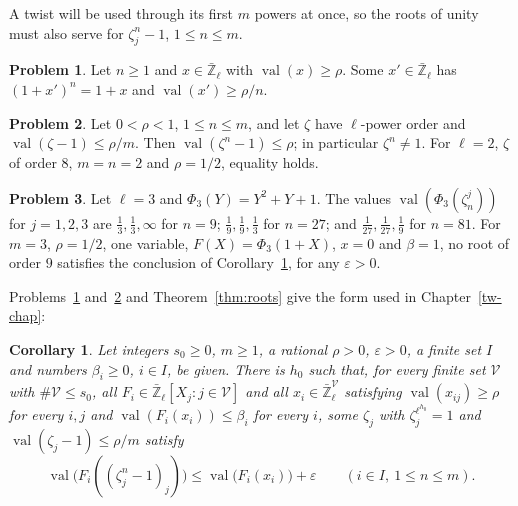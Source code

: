 \documentclass[reqno]{amsart}
\newcounter{chap}
\theoremstyle{definition}
\newtheorem{problem}{Problem}[section]
\theoremstyle{plain}
\newtheorem{corollary}[theorem]{Corollary}
\newcommand{\Zl}{\bar{\mathbb{Z}}_\ell}
\newcommand{\val}{\operatorname{val}}
\begin{document}
\medskip
A twist will be used through its first \(m\) powers at once, so the roots of unity must also serve for \(\zeta_j^n - 1\), \(1 \le n \le m\).

\begin{problem}\label{pr:root-of-x}
Let \(n \ge 1\) and \(x \in \Zl\) with \(\val(x) \ge \rho\).  Some \(x' \in \Zl\) has \((1 + x')^n = 1 + x\) and \(\val(x') \ge \rho/n\).
\end{problem}

\begin{problem}\label{pr:powers-far}
Let \(0 < \rho < 1\), \(1 \le n \le m\), and let \(\zeta\) have \(\ell\)-power order and \(\val(\zeta - 1) \le \rho/m\).  Then \(\val(\zeta^n - 1) \le \rho\); in particular \(\zeta^n \ne 1\).  For \(\ell = 2\), \(\zeta\) of order \(8\), \(m = n = 2\) and \(\rho = 1/2\), equality holds.
\end{problem}

\begin{problem}\label{pr:powers-table}
Let \(\ell = 3\) and \(\Phi_3(Y) = Y^2 + Y + 1\).  The values \(\val(\Phi_3(\zeta_n^j))\) for \(j = 1, 2, 3\) are \(\tfrac13, \tfrac13, \infty\) for \(n = 9\); \(\tfrac19, \tfrac19, \tfrac13\) for \(n = 27\); and \(\tfrac1{27}, \tfrac1{27}, \tfrac19\) for \(n = 81\).  For \(m = 3\), \(\rho = 1/2\), one variable, \(F(X) = \Phi_3(1 + X)\), \(x = 0\) and \(\beta = 1\), no root of order \(9\) satisfies the conclusion of Corollary~\ref{pr:powers}, for any \(\varepsilon > 0\).
\end{problem}

Problems~\ref{pr:root-of-x} and~\ref{pr:powers-far} and Theorem~\ref{thm:roots} give the form used in Chapter~\ref{tw-chap}:

\begin{corollary}\label{pr:powers}
Let integers \(s_0 \ge 0\), \(m \ge 1\), a rational \(\rho > 0\), \(\varepsilon > 0\), a finite set \(I\) and numbers \(\beta_i \ge 0\), \(i \in I\), be given.  There is \(h_0\) such that, for every finite set \(\mathcal V\) with \(\#\mathcal V \le s_0\), all \(F_i \in \Zl[X_j : j \in \mathcal V]\) and all \(x_i \in \Zl^\mathcal V\) satisfying \(\val(x_{ij}) \ge \rho\) for every \(i, j\) and \(\val(F_i(x_i)) \le \beta_i\) for every \(i\), some \(\zeta_j\) with \(\zeta_j^{\ell^{h_0}} = 1\) and \(\val(\zeta_j - 1) \le \rho/m\) satisfy
\[
  \val\bigl(F_i((\zeta_j^n - 1)_j)\bigr) \le \val\bigl(F_i(x_i)\bigr) + \varepsilon \qquad (i \in I,\ 1 \le n \le m).
\]
\end{corollary}
\end{document}
